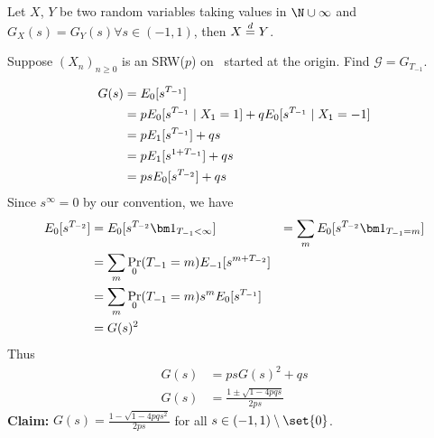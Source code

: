 Let $X$, $Y$ be two random variables taking values in $\N \cup \infty$ and
$G_X(s) = G_Y(s) \forall s \in (-1, 1)$, then $X \overset{d}{=} Y$.

\begin{problem}
    Suppose $(X_n)_{n \ge 0}$ is an SRW($p$) on \Z\ started at the origin.
    Find $\mathcal{G} = G_{T_{-1}}$.
\end{problem}
\begin{solution}
    \begin{align*}
        G(s) &= E_0[s^{T_{-1}}] \\
            &= p E_0[s^{T_{-1}} \mid X_1 = 1]
                + q E_0[s^{T_{-1}} \mid X_1 = -1] \\
            &= p E_1[s^{T_{-1}}] + q s \\
            &= p E_1[s^{1 + T_{-1}}] + q s \\
            &= p s E_0[s^{T_{-2}}] + q s
    \end{align*}
    Since $s^\infty = 0$ by our convention, we have \begin{align*}
        E_0[s^{T_{-2}}] &= E_0[s^{T_{-2}} \ind{T_{-1} < \infty}]
            &= \sum_{m} E_0[s^{T_{-2}} \ind{T_{-1} = m}] \\
            &= \sum_{m} \Pr_0(T_{-1} = m) E_{-1}[s^{m + T_{-2}}] \\
            &= \sum_{m} \Pr_0(T_{-1} = m) s^m E_0[s^{T_{-1}}] \\
            &= G(s)^2
    \end{align*}
    Thus \begin{align*}
        G(s) &= p s G(s)^2 + q s \\
        G(s) &= \frac{1 \pm \sqrt{1 - 4pq s}}{2ps}
    \end{align*}
    \textbf{Claim:} $G(s) = \frac{1 - \sqrt{1 - 4pqs^2}}{2ps}$ for all
    $s \in (-1, 1) \setminus \set{0}$.
\end{solution}
